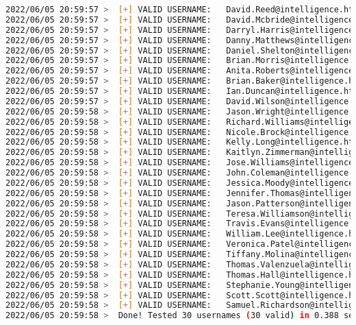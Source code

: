 \documentclass[a4paper]{article}
\begin{document}
\begin{lstlisting}[language=Bash, caption=kerbrute]
2022/06/05 20:59:57 >  [+] VALID USERNAME:	 David.Reed@intelligence.htb
2022/06/05 20:59:57 >  [+] VALID USERNAME:	 David.Mcbride@intelligence.htb
2022/06/05 20:59:57 >  [+] VALID USERNAME:	 Darryl.Harris@intelligence.htb
2022/06/05 20:59:57 >  [+] VALID USERNAME:	 Danny.Matthews@intelligence.htb
2022/06/05 20:59:57 >  [+] VALID USERNAME:	 Daniel.Shelton@intelligence.htb
2022/06/05 20:59:57 >  [+] VALID USERNAME:	 Brian.Morris@intelligence.htb
2022/06/05 20:59:57 >  [+] VALID USERNAME:	 Anita.Roberts@intelligence.htb
2022/06/05 20:59:57 >  [+] VALID USERNAME:	 Brian.Baker@intelligence.htb
2022/06/05 20:59:57 >  [+] VALID USERNAME:	 Ian.Duncan@intelligence.htb
2022/06/05 20:59:57 >  [+] VALID USERNAME:	 David.Wilson@intelligence.htb
2022/06/05 20:59:58 >  [+] VALID USERNAME:	 Jason.Wright@intelligence.htb
2022/06/05 20:59:58 >  [+] VALID USERNAME:	 Richard.Williams@intelligence.htb
2022/06/05 20:59:58 >  [+] VALID USERNAME:	 Nicole.Brock@intelligence.htb
2022/06/05 20:59:58 >  [+] VALID USERNAME:	 Kelly.Long@intelligence.htb
2022/06/05 20:59:58 >  [+] VALID USERNAME:	 Kaitlyn.Zimmerman@intelligence.htb
2022/06/05 20:59:58 >  [+] VALID USERNAME:	 Jose.Williams@intelligence.htb
2022/06/05 20:59:58 >  [+] VALID USERNAME:	 John.Coleman@intelligence.htb
2022/06/05 20:59:58 >  [+] VALID USERNAME:	 Jessica.Moody@intelligence.htb
2022/06/05 20:59:58 >  [+] VALID USERNAME:	 Jennifer.Thomas@intelligence.htb
2022/06/05 20:59:58 >  [+] VALID USERNAME:	 Jason.Patterson@intelligence.htb
2022/06/05 20:59:58 >  [+] VALID USERNAME:	 Teresa.Williamson@intelligence.htb
2022/06/05 20:59:58 >  [+] VALID USERNAME:	 Travis.Evans@intelligence.htb
2022/06/05 20:59:58 >  [+] VALID USERNAME:	 William.Lee@intelligence.htb
2022/06/05 20:59:58 >  [+] VALID USERNAME:	 Veronica.Patel@intelligence.htb
2022/06/05 20:59:58 >  [+] VALID USERNAME:	 Tiffany.Molina@intelligence.htb
2022/06/05 20:59:58 >  [+] VALID USERNAME:	 Thomas.Valenzuela@intelligence.htb
2022/06/05 20:59:58 >  [+] VALID USERNAME:	 Thomas.Hall@intelligence.htb
2022/06/05 20:59:58 >  [+] VALID USERNAME:	 Stephanie.Young@intelligence.htb
2022/06/05 20:59:58 >  [+] VALID USERNAME:	 Scott.Scott@intelligence.htb
2022/06/05 20:59:58 >  [+] VALID USERNAME:	 Samuel.Richardson@intelligence.htb
2022/06/05 20:59:58 >  Done! Tested 30 usernames (30 valid) in 0.388 seconds\end{lstlisting}
\end{document}
